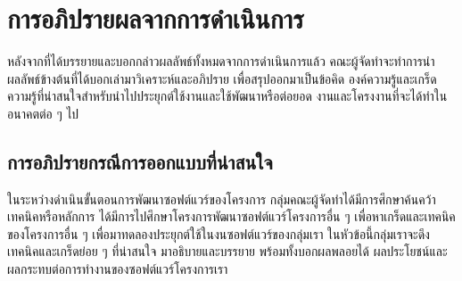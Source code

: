 \documentclass[12pt,one side,openright,a4paper]{cpe-thesis-th}
\newcommand{\thaijustify}[1]{%
  \par\hspace{30pt}\justifying
  #1
}
\begin{document}
\section{การอภิปรายผลจากการดำเนินการ}
\thaijustify{
  หลังจากที่ได้บรรยายและบอกกล่าวผลลัพธ์ทั้งหมดจากการดำเนินการแล้ว คณะผู้จัดทำจะทำการนำผลลัพธ์ข้างต้นที่ได้บอกเล่ามาวิเคราะห์และอภิปราย เพื่อสรุปออกมาเป็นข้อคิด องค์ความรู้และเกร็ดความรู้ที่น่าสนใจสำหรับนำไปประยุกต์ใช้งานและใช้พัฒนาหรือต่อยอด งานและโครงงานที่จะได้ทำในอนาคตต่อ ๆ ไป
}
\subsection{การอภิปรายกรณีการออกแบบที่น่าสนใจ}
\thaijustify{
  ในระหว่างดำเนินขั้นตอนการพัฒนาซอฟต์แวร์ของโครงการ กลุ่มคณะผู้จัดทำได้มีการศึกษาค้นคว้าเทคนิคหรือหลักการ ได้มีการไปศึกษาโครงการพัฒนาซอฟต์แวร์โครงการอื่น ๆ เพื่อหาเกร็ดและเทคนิคของโครงการอื่น ๆ เพื่อมาทดลองประยุกต์ใช้ในงนซอฟต์แวร์ของกลุ่มเรา ในหัวข้อนี้กลุ่มเราจะดึงเทคนิคและเกร็ดย่อย ๆ ที่น่าสนใจ มาอธิบายและบรรยาย พร้อมทั้งบอกผลพลอยได้ ผลประโยชน์และผลกระทบต่อการทำงานของซอฟต์แวร์โครงการเรา
}
\end{document}
